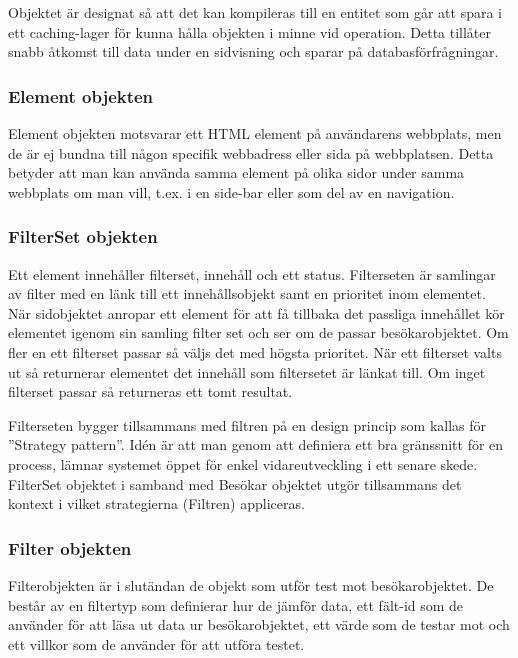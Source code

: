 Objektet är designat så att det kan kompileras till en entitet som går att spara i ett caching-lager för kunna hålla objekten i minne vid operation. Detta tillåter snabb åtkomst till data under en sidvisning och sparar på databasförfrågningar.

\subsubsection{Element objekten}



Element objekten motsvarar ett HTML element på användarens webbplats, men de är ej bundna till någon specifik webbadress eller sida på webbplatsen. Detta betyder att man kan använda samma element på olika sidor under samma webbplats om man vill, t.ex. i en side-bar eller som del av en navigation.

\subsubsection{FilterSet objekten}



Ett element innehåller filterset, innehåll och ett status. Filterseten är samlingar av filter med en länk till ett innehållsobjekt samt en prioritet inom elementet. När sidobjektet anropar ett element för att få tillbaka det passliga innehållet kör elementet igenom sin samling filter set och ser om de passar besökarobjektet. Om fler en ett filterset passar så väljs det med högsta prioritet. När ett filterset valts ut så returnerar elementet det innehåll som filtersetet är länkat till. Om inget filterset passar så returneras ett tomt resultat.

Filterseten bygger tillsammans med filtren på en design princip som kallas för ''Strategy pattern''. Idén är att man genom att definiera ett bra gränssnitt för en process, lämnar systemet öppet för enkel vidareutveckling i ett senare skede. \citep[s. 349]{gof} FilterSet objektet i samband med Besökar objektet utgör tillsammans det kontext i vilket strategierna (Filtren) appliceras.

\subsubsection{Filter objekten}



Filterobjekten är i slutändan de objekt som utför test mot besökarobjektet. De består av en filtertyp som definierar hur de jämför data, ett fält-id som de använder för att läsa ut data ur besökarobjektet, ett värde som de testar mot och ett villkor som de använder för att utföra testet.

